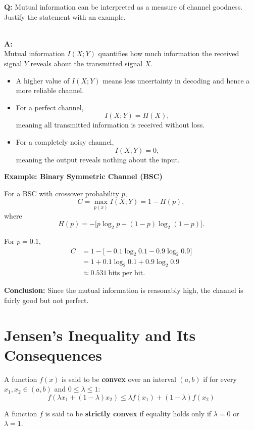 \documentclass[11pt,a4paper]{book}
\newenvironment{definitionbox}[1][Definition]{
    \begin{tcolorbox}[
        enhanced,
        breakable,
        colback=primaryblue!10,
        colframe=primaryblue!150,
        title=#1,
        fonttitle=\bfseries,
        sharp corners,
        boxrule=0.8pt,
        left=8pt,
        right=8pt,
        top=6pt,
        bottom=6pt
    ]
}{
    \end{tcolorbox}
}
\newcounter{qna}[chapter]
\renewcommand{\theqna}{\thechapter.\arabic{qna}}
\newenvironment{questionanswerbox}{
    \refstepcounter{qna}%
    \begin{tcolorbox}[
        enhanced,
        breakable,
        colback=softlavender!10,
        colframe=softlavender!200,
        title={Example~\theqna}, %
        fonttitle=\bfseries,
        coltitle=white,
        colbacktitle=softlavender!200,
        sharp corners,
        boxrule=1pt,
        left=8pt,
        right=8pt,
        top=6pt,
        bottom=6pt
    ]
}{
    \end{tcolorbox}
}
\begin{document}
\begin{questionanswerbox}
\textbf{Q:}
Mutual information can be interpreted as a measure of channel goodness.
Justify the statement with an example.

\medskip\\
\textbf{A:}
\medskip\\
Mutual information \(I(X;Y)\) quantifies how much information the received
signal \(Y\) reveals about the transmitted signal \(X\).

\begin{itemize}
    \item A higher value of \(I(X;Y)\) means less uncertainty in decoding
          and hence a more reliable channel.
    \item For a perfect channel,
          \[
              I(X;Y)=H(X),
          \]
          meaning all transmitted information is received without loss.
    \item For a completely noisy channel,
          \[
              I(X;Y)=0,
          \]
          meaning the output reveals nothing about the input.
\end{itemize}

\textbf{Example: Binary Symmetric Channel (BSC)}

For a BSC with crossover probability \(p\),
\[
C = \max_{p(x)} I(X;Y) = 1 - H(p),
\]
where
\[
H(p) = -\big[p\log_2 p + (1-p)\log_2(1-p)\big].
\]

For \(p=0.1\),
\begin{align*}
C
&= 1 - \big[-0.1\log_2 0.1 - 0.9\log_2 0.9\big] \\[6pt]
&= 1 + 0.1\log_2 0.1 + 0.9\log_2 0.9 \\[6pt]
&\approx 0.531 \ \text{bits per bit}.
\end{align*}

\textbf{Conclusion:}
Since the mutual information is reasonably high, the channel is fairly good
but not perfect.
\end{questionanswerbox}

\section{Jensen's Inequality and Its Consequences}

\begin{definitionbox}[Convex Function]
    A function \(f(x)\) is said to be \textbf{convex} over an interval \((a, b)\) if for every \(x_1, x_2 \in (a, b)\) and \(0 \leq \lambda \leq 1\):
    \[
        f(\lambda x_1 + (1-\lambda)x_2) \leq \lambda f(x_1) + (1-\lambda)f(x_2)
    \]

    A function \(f\) is said to be \textbf{strictly convex} if equality holds only if \(\lambda = 0\) or \(\lambda = 1\).
\end{definitionbox}
\end{document}
